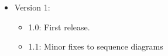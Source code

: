 \begin{itemize}
    \item Version 1:
        \begin{itemize}
            \item 1.0: First release.
            \item 1.1: Minor fixes to sequence diagrams
        \end{itemize}
\end{itemize}
